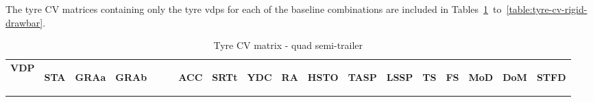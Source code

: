 The tyre CV matrices containing only the tyre \glspl{vdp} for each of the baseline combinations are included in Tables~\ref{table:tyre-cv-quad-semi}~to~\ref{table:tyre-cv-rigid-drawbar}.


\begin{table}[H]
\centering\scriptsize
\caption{Tyre CV matrix - quad semi-trailer}   
\label{table:tyre-cv-quad-semi}
\begin{tabular}{|l|c|c|c|c|c|c|c|c|c|c|c|c|c|c|c|}

\hline
\multicolumn{1}{|c|}{\textbf{VDP}} & \begin{sideways}\textbf{STA}\end{sideways} & \begin{sideways}\textbf{GRAa}\end{sideways} & \begin{sideways}\textbf{GRAb~~~~}\end{sideways} & \begin{sideways}\textbf{ACC}\end{sideways} & \begin{sideways}\textbf{SRTt}\end{sideways} & \begin{sideways}\textbf{YDC}\end{sideways} & \begin{sideways}\textbf{RA}\end{sideways} & \begin{sideways}\textbf{HSTO}\end{sideways} & \begin{sideways}\textbf{TASP}\end{sideways} & \begin{sideways}\textbf{LSSP}\end{sideways} & \begin{sideways}\textbf{TS}\end{sideways} & \begin{sideways}\textbf{FS}\end{sideways} & \begin{sideways}\textbf{MoD}\end{sideways} & \begin{sideways}\textbf{DoM}\end{sideways} & \begin{sideways}\textbf{STFD}\end{sideways} \bigstrut \\


\end{tabular}
\end{table}
